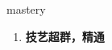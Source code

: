 
\begin{frame}
{\huge mastery}
\begin{center}
\begin{enumerate}\Large
  \item \textbf{技艺超群，精通}
\end{enumerate}
\end{center}
\end{frame}

